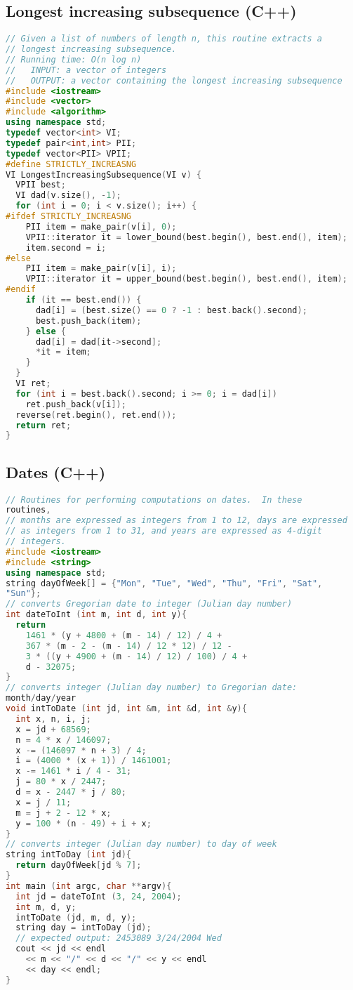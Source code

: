 \subsection{Longest increasing subsequence (C++)}
\begin{lstlisting}[language=C++]
// Given a list of numbers of length n, this routine extracts a 
// longest increasing subsequence.
// Running time: O(n log n)
//   INPUT: a vector of integers
//   OUTPUT: a vector containing the longest increasing subsequence
#include <iostream>
#include <vector>
#include <algorithm>
using namespace std;
typedef vector<int> VI;
typedef pair<int,int> PII;
typedef vector<PII> VPII;
#define STRICTLY_INCREASNG
VI LongestIncreasingSubsequence(VI v) {
  VPII best;
  VI dad(v.size(), -1);
  for (int i = 0; i < v.size(); i++) {
#ifdef STRICTLY_INCREASNG
    PII item = make_pair(v[i], 0);
    VPII::iterator it = lower_bound(best.begin(), best.end(), item);
    item.second = i;
#else
    PII item = make_pair(v[i], i);
    VPII::iterator it = upper_bound(best.begin(), best.end(), item);
#endif
    if (it == best.end()) {
      dad[i] = (best.size() == 0 ? -1 : best.back().second);
      best.push_back(item);
    } else {
      dad[i] = dad[it->second];
      *it = item;
    }
  }
  VI ret;
  for (int i = best.back().second; i >= 0; i = dad[i])
    ret.push_back(v[i]);
  reverse(ret.begin(), ret.end());
  return ret;
}
\end{lstlisting}
\subsection{Dates (C++)}
\begin{lstlisting}[language=C++]
// Routines for performing computations on dates.  In these 
routines,
// months are expressed as integers from 1 to 12, days are expressed
// as integers from 1 to 31, and years are expressed as 4-digit
// integers.
#include <iostream>
#include <string>
using namespace std;
string dayOfWeek[] = {"Mon", "Tue", "Wed", "Thu", "Fri", "Sat", 
"Sun"};
// converts Gregorian date to integer (Julian day number)
int dateToInt (int m, int d, int y){  
  return 
    1461 * (y + 4800 + (m - 14) / 12) / 4 +
    367 * (m - 2 - (m - 14) / 12 * 12) / 12 - 
    3 * ((y + 4900 + (m - 14) / 12) / 100) / 4 + 
    d - 32075;
}
// converts integer (Julian day number) to Gregorian date: 
month/day/year
void intToDate (int jd, int &m, int &d, int &y){
  int x, n, i, j; 
  x = jd + 68569;
  n = 4 * x / 146097;
  x -= (146097 * n + 3) / 4;
  i = (4000 * (x + 1)) / 1461001;
  x -= 1461 * i / 4 - 31;
  j = 80 * x / 2447;
  d = x - 2447 * j / 80;
  x = j / 11;
  m = j + 2 - 12 * x;
  y = 100 * (n - 49) + i + x;
}
// converts integer (Julian day number) to day of week
string intToDay (int jd){
  return dayOfWeek[jd % 7];
}
int main (int argc, char **argv){
  int jd = dateToInt (3, 24, 2004);
  int m, d, y;
  intToDate (jd, m, d, y);
  string day = intToDay (jd);
  // expected output: 2453089 3/24/2004 Wed
  cout << jd << endl
    << m << "/" << d << "/" << y << endl
    << day << endl;
}
\end{lstlisting}
